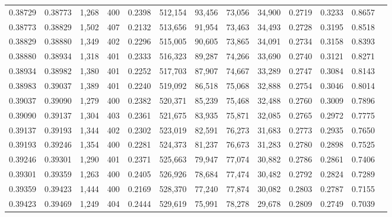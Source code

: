 \begin{tabular}{rrrrrrrrrrrrr}
0.38729 & 0.38773 &  1,268 & 400 &                                     0.2398 & 512,154 &  93,456 &  73,056 &  34,900 & 0.2719 & 0.3233 & 0.8657 \\
0.38773 & 0.38829 &  1,502 & 407 &                                     0.2132 & 513,656 &  91,954 &  73,463 &  34,493 & 0.2728 & 0.3195 & 0.8518 \\
0.38829 & 0.38880 &  1,349 & 402 &                                     0.2296 & 515,005 &  90,605 &  73,865 &  34,091 & 0.2734 & 0.3158 & 0.8393 \\
0.38880 & 0.38934 &  1,318 & 401 &                                     0.2333 & 516,323 &  89,287 &  74,266 &  33,690 & 0.2740 & 0.3121 & 0.8271 \\
0.38934 & 0.38982 &  1,380 & 401 &                                     0.2252 & 517,703 &  87,907 &  74,667 &  33,289 & 0.2747 & 0.3084 & 0.8143 \\
0.38983 & 0.39037 &  1,389 & 401 &                                     0.2240 & 519,092 &  86,518 &  75,068 &  32,888 & 0.2754 & 0.3046 & 0.8014 \\
0.39037 & 0.39090 &  1,279 & 400 &                                     0.2382 & 520,371 &  85,239 &  75,468 &  32,488 & 0.2760 & 0.3009 & 0.7896 \\
0.39090 & 0.39137 &  1,304 & 403 &                                     0.2361 & 521,675 &  83,935 &  75,871 &  32,085 & 0.2765 & 0.2972 & 0.7775 \\
0.39137 & 0.39193 &  1,344 & 402 &                                     0.2302 & 523,019 &  82,591 &  76,273 &  31,683 & 0.2773 & 0.2935 & 0.7650 \\
0.39193 & 0.39246 &  1,354 & 400 &                                     0.2281 & 524,373 &  81,237 &  76,673 &  31,283 & 0.2780 & 0.2898 & 0.7525 \\
0.39246 & 0.39301 &  1,290 & 401 &                                     0.2371 & 525,663 &  79,947 &  77,074 &  30,882 & 0.2786 & 0.2861 & 0.7406 \\
0.39301 & 0.39359 &  1,263 & 400 &                                     0.2405 & 526,926 &  78,684 &  77,474 &  30,482 & 0.2792 & 0.2824 & 0.7289 \\
0.39359 & 0.39423 &  1,444 & 400 &                                     0.2169 & 528,370 &  77,240 &  77,874 &  30,082 & 0.2803 & 0.2787 & 0.7155 \\
0.39423 & 0.39469 &  1,249 & 404 &                                     0.2444 & 529,619 &  75,991 &  78,278 &  29,678 & 0.2809 & 0.2749 & 0.7039 \\

\end{tabular}
